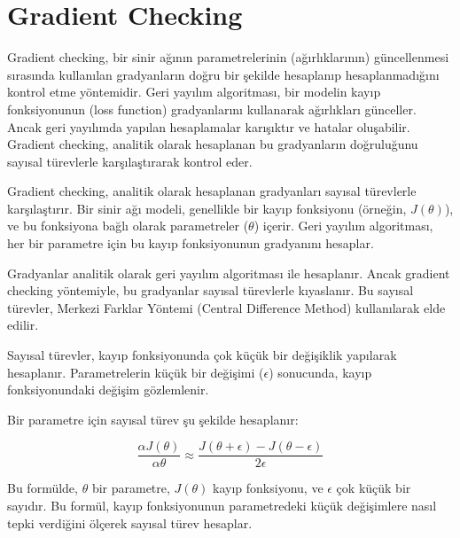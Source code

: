 \section{Gradient Checking}

Gradient checking, bir sinir ağının parametrelerinin (ağırlıklarının) güncellenmesi sırasında kullanılan gradyanların doğru bir şekilde hesaplanıp hesaplanmadığını kontrol etme yöntemidir. Geri yayılım algoritması, bir modelin kayıp fonksiyonunun (loss function) gradyanlarını kullanarak ağırlıkları günceller. Ancak geri yayılımda yapılan hesaplamalar karışıktır ve hatalar oluşabilir. Gradient checking, analitik olarak hesaplanan bu gradyanların doğruluğunu sayısal türevlerle karşılaştırarak kontrol eder.

Gradient checking, analitik olarak hesaplanan gradyanları sayısal türevlerle karşılaştırır. Bir sinir ağı modeli, genellikle bir kayıp fonksiyonu (örneğin, $J(\theta)$), ve bu fonksiyona bağlı olarak parametreler ($\theta$) içerir. Geri yayılım algoritması, her bir parametre için bu kayıp fonksiyonunun gradyanını hesaplar.

Gradyanlar analitik olarak geri yayılım algoritması ile hesaplanır. Ancak gradient checking yöntemiyle, bu gradyanlar sayısal türevlerle kıyaslanır. Bu sayısal türevler, Merkezi Farklar Yöntemi (Central Difference Method) kullanılarak elde edilir.

Sayısal türevler, kayıp fonksiyonunda çok küçük bir değişiklik yapılarak hesaplanır. Parametrelerin küçük bir değişimi ($\epsilon$) sonucunda, kayıp fonksiyonundaki değişim gözlemlenir.

Bir parametre için sayısal türev şu şekilde hesaplanır:

\[ \frac{\alpha J(\theta)}{\alpha \theta} \approx \frac{J(\theta + \epsilon) - J(\theta - \epsilon)}{2 \epsilon} \]

Bu formülde, $\theta$ bir parametre, $J(\theta)$ kayıp fonksiyonu, ve $\epsilon$ çok küçük bir sayıdır. Bu formül, kayıp fonksiyonunun parametredeki küçük değişimlere nasıl tepki verdiğini ölçerek sayısal türev hesaplar.


\newpage